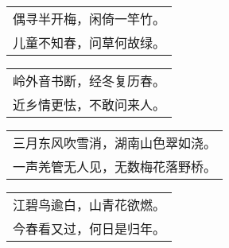 \noindent\begin{minipage}{\linewidth}
  \vskip-3pt\begin{table}[H]
    \centering
    \begin{tabular}{@{}l@{}}
偶寻半开梅，闲倚一竿竹。\\
儿童不知春，问草何故绿。
    \end{tabular}
  \end{table}
\end{minipage}
\vspace{1cm}


\noindent\begin{minipage}{\linewidth}
  \vskip-3pt\begin{table}[H]
    \centering
    \begin{tabular}{@{}l@{}}
岭外音书断，经冬复历春。\\
近乡情更怯，不敢问来人。
    \end{tabular}
  \end{table}
\end{minipage}
\vspace{1cm}


\noindent\begin{minipage}{\linewidth}
  \vskip-3pt\begin{table}[H]
    \centering
    \begin{tabular}{@{}l@{}}
三月东风吹雪消，湖南山色翠如浇。\\
一声羌管无人见，无数梅花落野桥。
    \end{tabular}
  \end{table}
\end{minipage}
\vspace{1cm}


\noindent\begin{minipage}{\linewidth}
  \vskip-3pt\begin{table}[H]
    \centering
    \begin{tabular}{@{}l@{}}
江碧鸟逾白，山青花欲燃。\\
今春看又过，何日是归年。
    \end{tabular}
  \end{table}
\end{minipage}
\vspace{1cm}


